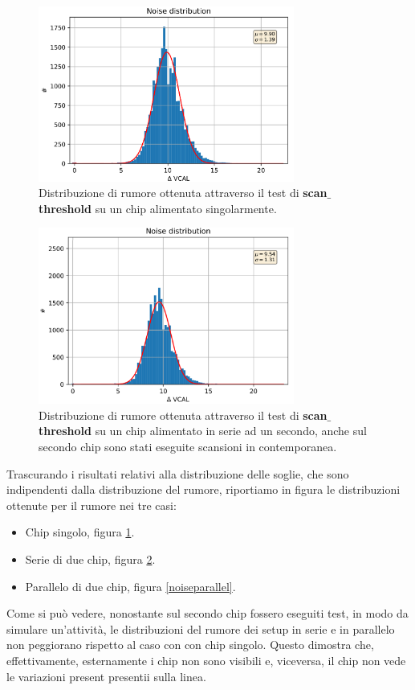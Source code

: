 \begin{figure}[h]
\centering
\includegraphics[width=0.75\textwidth]{Immagini/NoiseSingle}
\caption{Distribuzione di rumore ottenuta attraverso il test di \textbf{scan$\_$threshold} su un chip alimentato singolarmente.}
\label{noisesingle}
\end{figure}
\begin{figure}
\centering
\includegraphics[width=0.75\textwidth]{Immagini/NoiseSerial}
\caption{Distribuzione di rumore ottenuta attraverso il test di \textbf{scan$\_$threshold} su un chip alimentato in serie ad un secondo, anche sul secondo chip sono stati eseguite scansioni in contemporanea.}
\label{noiseserial}
\end{figure}

Trascurando i risultati relativi alla distribuzione delle soglie, che sono indipendenti dalla distribuzione del rumore, riportiamo in figura le distribuzioni ottenute per il rumore nei tre casi:
\begin{itemize}
\item Chip singolo, figura \ref{noisesingle}.
\item Serie di due chip, figura \ref{noiseserial}.
\item Parallelo di due chip, figura \ref{noiseparallel}.
\end{itemize}
Come si può vedere, nonostante sul secondo chip fossero eseguiti test, in modo da simulare un'attività, le distribuzioni del rumore dei setup in serie e in parallelo non peggiorano rispetto al caso con con chip singolo.
Questo dimostra che, effettivamente, esternamente i chip non sono visibili e, viceversa, il chip non vede le variazioni present presentii sulla linea.

